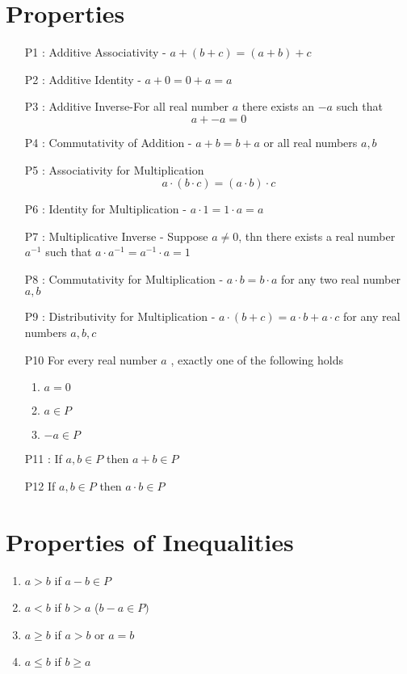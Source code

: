 \documentclass{article} %
\theoremstyle{plain}
\theoremstyle{case}
\begin{document}
\section*{Properties}
  \begin{enumerate}
        \item[P1]: Additive Associativity - $a + (b+c) = (a+b)+c$
        \item[P2]: Additive Identity - $a + 0 = 0+a = a$
        \item[P3]: Additive Inverse-For all real number $a$ there exists
          an $-a$ such that
            $$a + -a = 0$$
        \item[P4]: Commutativity of Addition - $a+b = b+a$ or all real
          numbers $a,  b$
        \item[P5]: Associativity for Multiplication
          \[ a \cdot (b \cdot c) = (a \cdot b) \cdot c \]
        \item[P6]: Identity for Multiplication - $a \cdot 1 = 1 \cdot a = a$
        \item[P7]: Multiplicative Inverse - Suppose $a \neq 0$, thn
          there exists a real number $a^{-1}$ such that
          $a \cdot a^{-1} = a^{-1} \cdot a = 1$
        \item[P8]: Commutativity for Multiplication - $a \cdot b=b \cdot a$
          for any two real number $a,b$
        \item[P9]: Distributivity for Multiplication -
          $a \cdot (b +c) = a \cdot b  + a \cdot c$
          for any real numbers $a,b,c$
        \item[P10] For every real number $a$ , exactly one of the
          following holds
          \begin{enumerate}
            \item $a=0$
            \item $a \in P$
            \item $-a \in P$
          \end{enumerate}
        \item[P11]: If $a,b \in P$ then $a+b \in P$
        \item[P12] If $a,b \in P$ then $a \cdot b \in P$
  \end{enumerate}

\section*{Properties of Inequalities}
    \begin{enumerate}
      \item $ a> b$ if $a-b \in P$
      \item $ a < b$ if $b > a$ ($b-a \in P)$
      \item $ a \geq b$ if $a > b$ or $a = b$
      \item $ a \leq b$ if $b \geq a$
    \end{enumerate}
\end{document}
